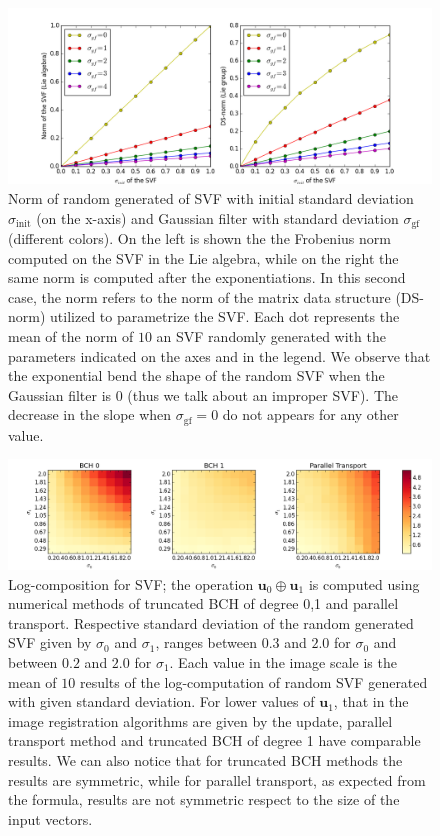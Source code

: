 \begin{figure}[!ht]
	\hspace{-2.5cm}
	\includegraphics[scale=0.6]{figures/SVF_sigma_means_comparisons.png}
	\caption{Norm of random generated of SVF with initial standard deviation $\sigma_{\text{init}}$ (on the x-axis) and Gaussian filter with standard deviation $\sigma_{\text{gf}}$ (different colors). On the left is shown the the Frobenius norm computed on the SVF in the Lie algebra, while on the right the same norm is computed after the exponentiations. In this second case, the norm refers to the norm of the matrix data structure (DS-norm) utilized to parametrize the SVF. Each dot represents the mean of the norm of $10$ an SVF randomly generated with the parameters indicated on the axes and in the legend. We observe that the exponential bend the shape of the random SVF when the Gaussian filter is $0$ (thus we talk about an improper SVF). The decrease in the slope when $\sigma_{\text{gf}}=0$ do not appears for any other value.}
	\label{fig:SVF_sigma_means_comparisons}
\end{figure}





\begin{figure}[!ht]
	\hspace{-2.1cm}
	\includegraphics[scale=0.53]{figures/SVF_image_scale.png}
	\caption{Log-composition for SVF; the operation $\mathbf{u}_0\oplus \mathbf{u}_1$ is computed using numerical methods of truncated BCH of degree 0,1 and parallel transport. Respective standard deviation of the random generated SVF given by $\sigma_0$ and $\sigma_1$, ranges between $0.3$ and $2.0$ for $\sigma_0$ and between $0.2$ and $2.0$ for $\sigma_1$. Each value in the image scale is the mean of $10$ results of the log-computation of random SVF generated with given standard deviation. For lower values of $\mathbf{u}_1$, that in the image registration algorithms are given by the update, parallel transport method and truncated BCH of degree 1 have comparable results. We can also notice that for truncated BCH methods the results are symmetric, while for parallel transport, as expected from the formula, results are not symmetric respect to the size of the input vectors. }
	\label{fig:SVF_image_scale}
\end{figure}


